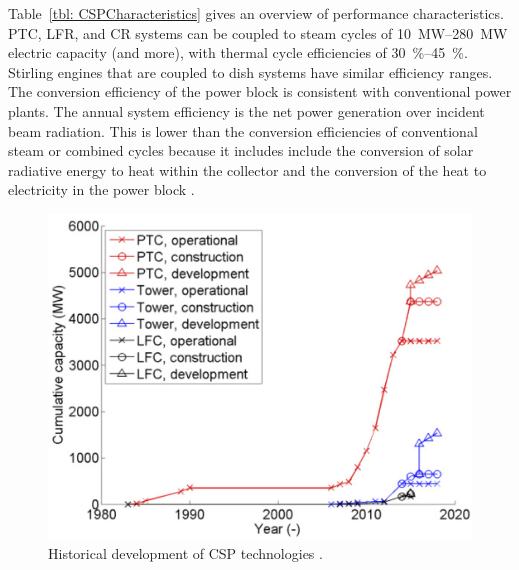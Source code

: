 
Table~\ref{tbl: CSPCharacteristics} gives an overview of performance characteristics. PTC, LFR, and CR systems can be coupled to steam cycles of \SIrange{10}{280}{\mega\watt} electric capacity (and more), with thermal cycle efficiencies of \SIrange{30}{45}{\percent}. Stirling engines that are coupled to dish systems have similar efficiency ranges. The conversion efficiency of the power block is consistent with conventional power plants. The annual system efficiency is the net power generation over incident beam radiation. This is lower than the conversion efficiencies of conventional steam or combined cycles because it includes include the conversion of solar radiative energy to heat within the collector and the conversion of the heat to electricity in the power block \cite{Pitz-Paal.2013}.

\begin{figure}[!h] 
\centering
\includegraphics[width=0.65\linewidth]{FIG/CSP_technology_development}
\caption[Historical development of CSP technologies.]{Historical development of CSP technologies \cite{Abbas2015}.}\label{CSP_technology_development}
\end{figure}

